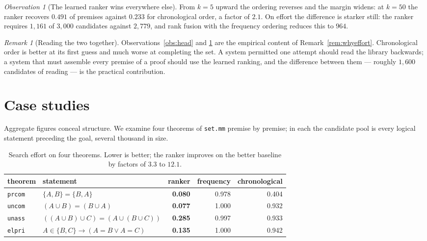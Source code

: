 \documentclass[11pt]{article}
\theoremstyle{plain}
\theoremstyle{definition}
\theoremstyle{remark}
\newtheorem{remark}[theorem]{Remark}
\newtheorem{observation}[theorem]{Observation}
\begin{document}
\begin{observation}[The learned ranker wins everywhere else]\label{obs:tail}
From $k=5$ upward the ordering reverses and the margin widens: at $k=50$ the
ranker recovers $0.491$ of premises against $0.233$ for chronological order, a
factor of $2.1$. On effort the difference is starker still: the ranker requires
$1{,}161$ of $3{,}000$ candidates against $2{,}779$, and rank fusion with the
frequency ordering reduces this to $964$.
\end{observation}

\begin{remark}[Reading the two together]
Observations~\ref{obs:head} and \ref{obs:tail} are the empirical content of
Remark~\ref{rem:whyeffort}. Chronological order is better at its first guess and
much worse at completing the set. A system permitted one attempt should read the
library backwards; a system that must assemble every premise of a proof should
use the learned ranking, and the difference between them --- roughly $1{,}600$
candidates of reading --- is the practical contribution.
\end{remark}

\section{Case studies}\label{sec:cases}

Aggregate figures conceal structure. We examine four theorems of \texttt{set.mm}
premise by premise; in each the candidate pool is every logical statement
preceding the goal, several thousand in size.

\begin{table}[htbp]\centering
\small
\begin{tabular}{@{}llrrr@{}}
\toprule
theorem & statement & ranker & frequency & chronological\\
\midrule
\texttt{prcom} & $\{A,B\}=\{B,A\}$ & \textbf{0.080} & 0.978 & 0.404\\
\texttt{uncom} & $(A\cup B)=(B\cup A)$ & \textbf{0.077} & 1.000 & 0.932\\
\texttt{unass} & $((A\cup B)\cup C)=(A\cup(B\cup C))$ & \textbf{0.285} & 0.997 & 0.933\\
\texttt{elpri} & $A\in\{B,C\}\rightarrow(A=B\vee A=C)$ & \textbf{0.135} & 1.000 & 0.942\\
\bottomrule
\end{tabular}
\caption{Search effort on four theorems. Lower is better; the ranker improves on
the better baseline by factors of $3.3$ to $12.1$.}
\label{tab:cases}
\end{table}
\end{document}
